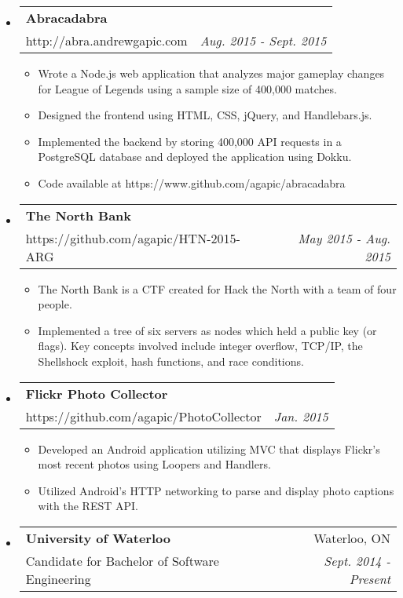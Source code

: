 \documentclass[letterpaper,10pt]{article}
\makeatletter
\newcommand{\resitem}[1]{\item #1 \vspace{-2pt}}
\newcommand{\resheading}[1]{{\large \parashade[.9]{sharpcorners}{\textbf{#1 \vphantom{p\^{E}}}}}}
\newcommand{\ressubheading}[4]{
\begin{tabular*}{6.5in}{l@{\extracolsep{\fill}}r}
		\textbf{#1} & #2 \\
		{#3} & \textit{#4} \\
\end{tabular*}\vspace{-6pt}}
\makeatother
\begin{document}
\begin{itemize}
\item
\vspace{-0.17in}
		\ressubheading{Abracadabra}{}{http://abra.andrewgapic.com}{Aug. 2015 - Sept. 2015}
	\begin{itemize}
		\resitem{Wrote a Node.js web application that analyzes major gameplay changes for League of Legends using a sample size of 400,000 matches.}
		\resitem{Designed the frontend using HTML, CSS, jQuery, and Handlebars.js.}
		\resitem{Implemented the backend by storing 400,000 API requests in a PostgreSQL database and deployed the application using Dokku.}
		\resitem{Code available at https://www.github.com/agapic/abracadabra}
	\end{itemize}
\item
		\ressubheading{The North Bank}{}{https://github.com/agapic/HTN-2015-ARG}{May 2015 - Aug. 2015}
	\begin{itemize}
		\resitem{The North Bank is a CTF created for Hack the North with a team of four people.}
		\resitem{Implemented a tree of six servers as nodes which held a public key (or flags). Key concepts involved include integer overflow, TCP/IP, the Shellshock exploit, hash functions, and race conditions.}
\end{itemize}
\item
		\ressubheading{Flickr Photo Collector}{}{https://github.com/agapic/PhotoCollector}{Jan. 2015}
	\begin{itemize}
		\resitem{Developed an Android application utilizing MVC that displays Flickr's most recent photos using Loopers and Handlers.}
		\resitem{Utilized Android's HTTP networking to parse and display photo captions with the REST API.}

\end{itemize}

\end{itemize}
\vspace{-0.3in}

\resheading{Education}
\begin{itemize}
\item\vspace{-0.17in}
	\ressubheading{University of Waterloo}{Waterloo, ON}{Candidate for Bachelor of Software Engineering}{Sept. 2014 - Present}



\end{itemize}
\end{document}
